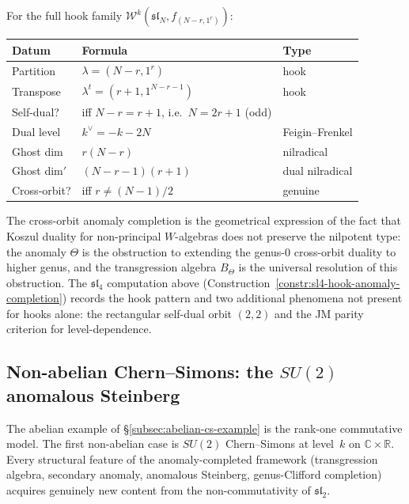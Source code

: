 \begin{remark}
\label{rem:hook-anomaly-general}
For the full hook family
$\mathcal W^k(\mathfrak{sl}_N,f_{(N-r,1^r)})$:
\begin{center}
\renewcommand{\arraystretch}{1.2}
\begin{tabular}{lll}
\textbf{Datum} & \textbf{Formula} & \textbf{Type} \\
\hline
Partition & $\lambda=(N{-}r,1^r)$ & hook \\
Transpose & $\lambda^t=(r{+}1,1^{N{-}r{-}1})$ & hook \\
Self-dual? & iff $N{-}r=r{+}1$, i.e.\ $N=2r{+}1$ (odd) & \\
Dual level & $k^\vee=-k-2N$ & Feigin--Frenkel \\
Ghost dim & $r(N{-}r)$ & nilradical \\
Ghost dim$'$ & $(N{-}r{-}1)(r{+}1)$ & dual nilradical \\
Cross-orbit? & iff $r\neq(N{-}1)/2$ & genuine \\
\end{tabular}
\end{center}
The cross-orbit anomaly completion is the geometrical expression of
the fact that Koszul duality for non-principal
$W$-algebras does not preserve the nilpotent type: the
anomaly $\Theta$ is the obstruction to extending the
genus-$0$ cross-orbit duality to higher genus, and the
transgression algebra $B_\Theta$ is the universal resolution
of this obstruction.
The $\mathfrak{sl}_4$ computation above
(Construction~\ref{constr:sl4-hook-anomaly-completion}) records the
hook pattern and two additional phenomena
not present for hooks alone: the rectangular self-dual orbit $(2,2)$
and the JM parity criterion for level-dependence.
\end{remark}

\subsection{Non-abelian Chern--Simons: the \texorpdfstring{$SU(2)$}{SU(2)}
anomalous Steinberg}
\label{subsec:su2-anomalous-steinberg}

The abelian example of \S\ref{subsec:abelian-cs-example} is the
rank-one commutative model. The first non-abelian case is
\(SU(2)\) Chern--Simons at level~\(k\) on \(\mathbb C\times\mathbb R\).
Every structural feature of the anomaly-completed framework (transgression
algebra, secondary anomaly, anomalous Steinberg, genus-Clifford
completion) acquires genuinely new content from the non-commutativity of
$\mathfrak{sl}_2$.

